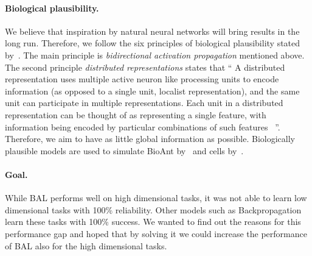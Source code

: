 \paragraph{Biological plausibility.} We believe that inspiration by natural neural networks will bring results in the long run. Therefore, we follow the six principles of biological plausibility stated by~\citet{hinton1988learning}. The main principle is \emph{bidirectional activation propagation} mentioned above. The second principle \emph{distributed representations} states that \enquote{
  A distributed representation uses multiple active neuron like processing units to encode information (as opposed to a single unit, localist representation), and the same unit can participate in multiple representations. Each unit in a distributed representation can be thought of as representing a single feature, with information being encoded by particular combinations of such features~\citep[pp.~ 456]{o1998six}
}. Therefore, we aim to have as little global information as possible. Biologically plausible models are used to simulate BioAnt by~\citet{schneider2009application} and cells by~\citet{nawrocki2012monitoring}. 

\paragraph{Goal.}
While BAL performs well on high dimensional tasks, it was not able to learn low dimensional tasks with 100\% reliability. Other models such as Backpropagation~\citep{rumelhart1986learning} learn these tasks with 100\% success. We wanted to find out the reasons for this performance gap and hoped that by solving it we could increase the performance of BAL also for the high dimensional tasks. 



